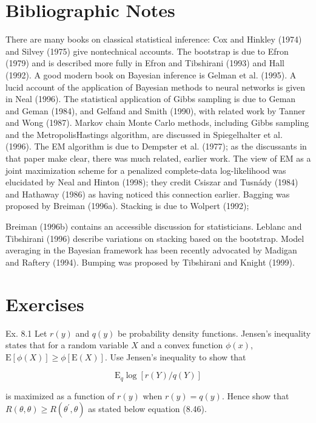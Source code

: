 \documentclass[10pt]{article}
\begin{document}
\section*{Bibliographic Notes}
There are many books on classical statistical inference: Cox and Hinkley (1974) and Silvey (1975) give nontechnical accounts. The bootstrap is due to Efron (1979) and is described more fully in Efron and Tibshirani (1993) and Hall (1992). A good modern book on Bayesian inference is Gelman et al. (1995). A lucid account of the application of Bayesian methods to neural networks is given in Neal (1996). The statistical application of Gibbs sampling is due to Geman and Geman (1984), and Gelfand and Smith (1990), with related work by Tanner and Wong (1987). Markov chain Monte Carlo methods, including Gibbs sampling and the MetropolisHastings algorithm, are discussed in Spiegelhalter et al. (1996). The EM algorithm is due to Dempster et al. (1977); as the discussants in that paper make clear, there was much related, earlier work. The view of EM as a joint maximization scheme for a penalized complete-data log-likelihood was elucidated by Neal and Hinton (1998); they credit Csiszar and Tusnády (1984) and Hathaway (1986) as having noticed this connection earlier. Bagging was proposed by Breiman (1996a). Stacking is due to Wolpert (1992);

Breiman (1996b) contains an accessible discussion for statisticians. Leblanc and Tibshirani (1996) describe variations on stacking based on the bootstrap. Model averaging in the Bayesian framework has been recently advocated by Madigan and Raftery (1994). Bumping was proposed by Tibshirani and Knight (1999).

\section*{Exercises}
Ex. 8.1 Let $r(y)$ and $q(y)$ be probability density functions. Jensen's inequality states that for a random variable $X$ and a convex function $\phi(x)$, $\mathrm{E}[\phi(X)] \geq \phi[\mathrm{E}(X)]$. Use Jensen's inequality to show that


\begin{equation*}
\mathrm{E}_{q} \log [r(Y) / q(Y)] \tag{8.61}
\end{equation*}


is maximized as a function of $r(y)$ when $r(y)=q(y)$. Hence show that $R(\theta, \theta) \geq R\left(\theta^{\prime}, \theta\right)$ as stated below equation (8.46).
\end{document}
